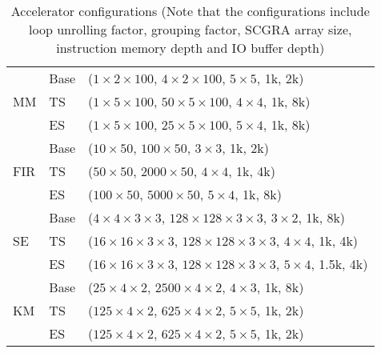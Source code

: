 \begin{table}[htb]
    \footnotesize
    \centering
    \caption{Accelerator configurations (Note that the configurations include loop unrolling factor, grouping factor, SCGRA array size, instruction memory depth and IO buffer depth) \label{tab:acc-config}}{
        \begin{tabular}{l|l|l}
            \hline
            \multirow{3}{*}{MM}  & Base & ($1 \times 2 \times 100$, $4 \times 2 \times 100$, $5
        \times 5$, 1k, 2k)\\ \cline{2-3}
                                 & TS & ($1 \times 5 \times 100$, $50 \times 5 \times 100$, $4
        \times 4$, 1k, 8k)\\ \cline{2-3}
                                 & ES & ($1 \times 5 \times 100$, $25 \times 5 \times 100$, $5
        \times 4$, 1k, 8k)\\ \hline
            \multirow{3}{*}{FIR}  & Base & ($ 10 \times 50$, $100 \times 50$, $3
        \times 3$, 1k, 2k)\\ \cline{2-3}
                                 & TS & ($50 \times 50$, $2000 \times 50 $, $4
        \times 4$, 1k, 4k)\\ \cline{2-3}
                                 & ES & ($100 \times 50$, $5000 \times 50$, $5
        \times 4$, 1k, 8k)\\ \hline
            \multirow{3}{*}{SE}  & Base & ($4 \times 4 \times 3 \times 3$, $128 \times 128 \times 3
        \times 3$, $3 \times 2$, 1k, 8k)\\ \cline{2-3}
                                 & TS & ($16 \times 16 \times 3 \times 3$, $128 \times 128 \times 3
        \times 3$, $4 \times 4$, 1k, 4k)\\ \cline{2-3}
                                 & ES & ($16 \times 16 \times 3 \times 3$, $128 \times 128 \times 3
        \times 3$, $5 \times 4$, 1.5k, 4k)\\ \hline
            \multirow{3}{*}{KM}  & Base & ($25 \times 4 \times 2$, $2500 \times 4 \times 2$, $4
        \times 3$, 1k, 8k)\\ \cline{2-3}
                                 & TS & ($125 \times 4 \times 2$, $625 \times 4 \times 2$, $5
        \times 5$, 1k, 2k)\\ \cline{2-3}
                                 & ES & ($125 \times 4 \times 2$, $625 \times 4 \times 2$, $5
        \times 5$, 1k, 2k)\\ \hline

        \end{tabular}
    }
\end{table}

